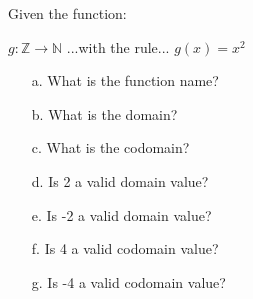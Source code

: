 \documentclass[a4paper,12pt]{book}
\newcounter{question}
\begin{document}
    \begin{questionNOGRADE}{\thequestion}

        Given the function:

        \begin{center}
            $ g : \mathbb{Z} \to \mathbb{N} $
            \tab ...with the rule... \tab
            $ g(x) = x^{2} $
        \end{center}

        \begin{enumerate}
            \item[a.]   What is the function name?  
            \item[b.]   What is the domain?  
            \item[c.]   What is the codomain?  
            \item[d.]   Is 2 a valid domain value?  
            \item[e.]   Is -2 a valid domain value?  
            \item[f.]   Is 4 a valid codomain value?  
            \item[g.]   Is -4 a valid codomain value?  
        \end{enumerate}

    \end{questionNOGRADE}

    \notonkey{ \newpage }{ \hrulefill }
\end{document}
